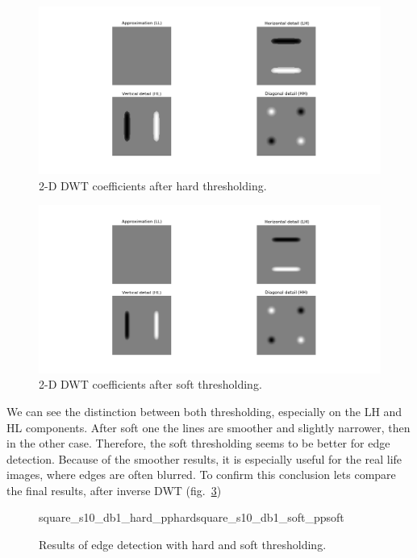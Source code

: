 \begin{figure}[h]
	\centering
	\includegraphics[width=\textwidth]{graphs/square_s10_db1_hard_coeffs_d.png}
	\caption{2-D DWT coefficients after hard thresholding.}
	\label{fig:square_s10_hard_coeffs_d}
\end{figure}

\begin{figure}[h]
	\centering
	\includegraphics[width=\textwidth]{graphs/square_s10_db1_soft_coeffs_d.png}
	\caption{2-D DWT coefficients after soft thresholding.}
	\label{fig:square_s10_soft_coeffs_d}
\end{figure}

We can see the distinction between both thresholding, especially on the LH and HL components. After soft one the lines are smoother and slightly narrower, then in the other case. Therefore, the soft thresholding seems to be better for edge detection. Because of the smoother results, it is especially useful for the real life images, where edges are often blurred. To confirm this conclusion lets compare the final results, after inverse DWT (fig.~\ref{fig:square_s10_idwt_pp})

\begin{figure}[h]
	\begin{subdiagrams2}{square_s10_db1_hard_pp}{hard}{square_s10_db1_soft_pp}{soft}
	\end{subdiagrams2}
	\centering
	\caption{Results of edge detection with hard and soft thresholding.}
	\label{fig:square_s10_idwt_pp}
\end{figure}

